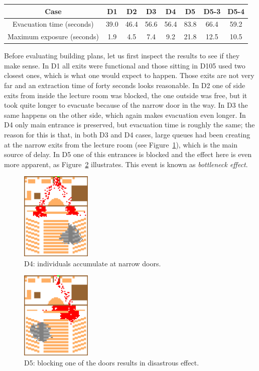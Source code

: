 \begin{center}
    \label{table:results_d}
    \begin{tabular}{ c | c | c | c | c | c | c | c }
        \hline
        Case & D1 & D2 & D3 & D4 & D5 & D5-3 & D5-4 \\
        \hline
        Evacuation time (seconds) & 39.0 & 46.4 & 56.6 & 56.4 & 83.8 & 66.4 & 59.2 \\
        Maximum exposure (seconds) & 1.9 & 4.5 & 7.4 & 9.2 & 21.8 & 12.5 & 10.5 \\
        \hline
    \end{tabular}
\end{center}

Before evaluating building plans, let us first inspect the results to see if
they make sense.
In D1 all exits were functional and those sitting in D105 used two closest ones,
which is what one would expect to happen.
Those exits are not very far and an extraction time of forty seconds looks
reasonable.
In D2 one of side exits from inside the lecture room was blocked, the one
outside was free, but it took quite longer to evacuate because of the
narrow door in the way.
In D3 the same happens on the other side, which again makes evacuation even
longer.
In D4 only main entrance is preserved, but evacuation time is roughly the same;
the reason for this is that, in both D3 and D4 cases, large queues had been
creating at the narrow exits from the lecture room
(see Figure~\ref{fig:d4bn}), which is the main source of delay.
In D5 one of this entrances is blocked and the effect here is even more
apparent, as Figure~\ref{fig:d5bn} illustrates.
This event is known as \emph{bottleneck effect}.

\begin{figure}
    \includegraphics[width=0.3\textwidth]{figures/d4bn.eps}
    \caption{D4: individuals accumulate at narrow doors.}
    \label{fig:d4bn}
\end{figure}

\begin{figure}
    \includegraphics[width=0.3\textwidth]{figures/d5bn.eps}
    \caption{D5: blocking one of the doors results in disastrous effect.}
    \label{fig:d5bn}
\end{figure}

